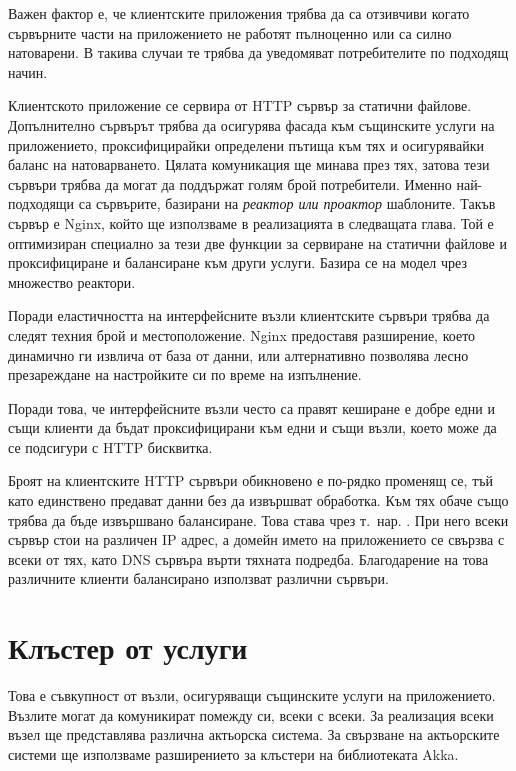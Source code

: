 Важен фактор е, че клиентските приложения трябва да са отзивчиви когато сървърните части на приложението не работят пълноценно или са силно натоварени. В такива случаи те трябва да уведомяват потребителите по подходящ начин.

Клиентското приложение се сервира от HTTP сървър за статични файлове. Допълнително сървърът трябва да осигурява фасада към същинските услуги на приложението, проксифицирайки определени пътища към тях и осигурявайки баланс на натоварването. Цялата комуникация ще минава през тях, затова тези сървъри трябва да могат да поддържат голям брой потребители. Именно най-подходящи са сървърите, базирани на \emph{реактор или проактор} шаблоните. Такъв сървър е Nginx, който ще използваме в реализацията в следващата глава. Той е оптимизиран специално за тези две функции за сервиране на статични файлове и проксифициране и балансиране към други услуги. Базира се на модел чрез множество реактори.

Поради еластичността на интерфейсните възли клиентските сървъри трябва да следят техния брой и местоположение. Nginx предоставя разширение, което динамично ги извлича от база от данни, или алтернативно позволява лесно презареждане на настройките си по време на изпълнение.

Поради това, че интерфейсните възли често са правят кеширане е добре едни и същи клиенти да бъдат проксифицирани към едни и същи възли, което може да се подсигури с HTTP бисквитка.

Броят на клиентските HTTP сървъри обикновено е по-рядко променящ се, тъй като единствено предават данни без да извършват обработка. Към тях обаче също трябва да бъде извършвано балансиране. Това става чрез т.~нар. . При него всеки сървър стои на различен IP адрес, а домейн името на приложението се свързва с всеки от тях, като DNS сървъра върти тяхната подредба. Благодарение на това различните клиенти балансирано използват различни сървъри.

\section{Клъстер от услуги}

Това е съвкупност от възли, осигуряващи същинските услуги на приложението. Възлите могат да комуникират помежду си, всеки с всеки. За реализация всеки възел ще представлява различна актьорска система. За свързване на актьорските системи ще използваме разширението за клъстери на библиотеката Akka.

